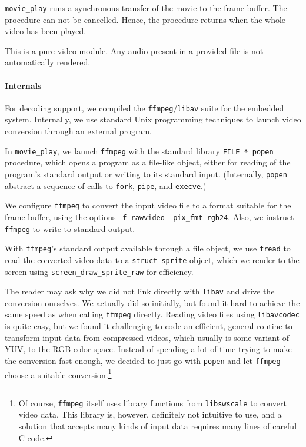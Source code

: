\documentclass[a4paper,10pt]{article}
\newcommand{\isrc}[1]{\texttt{#1}}
\begin{document}
\isrc{movie\_play} runs a synchronous transfer of the movie to the
frame buffer. The procedure can not be cancelled. Hence, the procedure returns
when the whole video has been played.

This is a pure-video module. Any audio present in a provided file is not
automatically rendered.

\paragraph{Internals}
For decoding support, we compiled the \texttt{ffmpeg}/\texttt{libav} suite for
the embedded system.
Internally, we use standard Unix programming techniques to launch video
conversion through an external program.

In \isrc{movie\_play}, we launch \texttt{ffmpeg} with the standard library
\isrc{FILE * popen} procedure, which opens a program as a file-like object,
either for reading of the program's standard output or writing to its
standard input. (Internally, \isrc{popen} abstract a sequence of calls to
\isrc{fork}, \isrc{pipe}, and \isrc{execve}.) 

We configure \texttt{ffmpeg} to convert the input video file to a format
suitable for the frame buffer, using the options \isrc{-f rawvideo -pix\_fmt
rgb24}.  Also, we instruct \texttt{ffmpeg} to write to standard output.

With \texttt{ffmpeg}'s standard output available through a file object, we use
\isrc{fread} to read the converted video data to a \isrc{struct sprite}
object, which we render to the screen using \isrc{screen\_draw\_sprite\_raw}
for efficiency.

The reader may ask why we did not link directly with \isrc{libav} and drive
the conversion ourselves. We actually did so initially, but found it hard to
achieve the same speed as when calling \texttt{ffmpeg} directly.  
Reading video files using \isrc{libavcodec} is quite easy, but we found it
challenging to code an efficient, general routine to transform input data from
compressed videos, which usually is some variant of YUV, to the RGB color
space. Instead of spending a lot of time trying to make the conversion fast
enough, we decided to just go with \isrc{popen} and let \texttt{ffmpeg} choose
a suitable conversion.\footnote{Of course, \texttt{ffmpeg} itself uses library
functions from \texttt{libswscale} to convert video data. This library is,
however, definitely not intuitive to use, and a solution that accepts many
kinds of input data requires many lines of careful C code.} 
\end{document}
